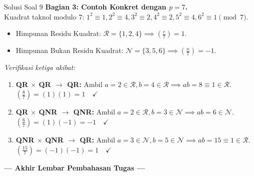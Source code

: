 \documentclass[11pt,a4paper]{article}
\begin{document}
\begin{solusibox}{Solusi Soal 9}
\textbf{Bagian 3: Contoh Konkret dengan $p = 7$.} \\
Kuadrat taknol modulo $7$: $1^2 \equiv 1, 2^2 \equiv 4, 3^2 \equiv 2, 4^2 \equiv 2, 5^2 \equiv 4, 6^2 \equiv 1 \pmod 7$.
\begin{itemize}
    \item Himpunan Residu Kuadrat: $\mathcal{R} = \{1, 2, 4\} \implies \left(\frac{r}{7}\right) = 1$.
    \item Himpunan Bukan Residu Kuadrat: $\mathcal{N} = \{3, 5, 6\} \implies \left(\frac{n}{7}\right) = -1$.
\end{itemize}
\textit{Verifikasi ketiga akibat:}
\begin{enumerate}
    \item \textbf{QR $\times$ QR $\rightarrow$ QR:} Ambil $a = 2 \in \mathcal{R}, b = 4 \in \mathcal{R} \implies ab = 8 \equiv 1 \in \mathcal{R}$.  
    $\left(\frac{8}{7}\right) = (1)(1) = 1 \quad \checkmark$
    \item \textbf{QR $\times$ QNR $\rightarrow$ QNR:} Ambil $a = 2 \in \mathcal{R}, b = 3 \in \mathcal{N} \implies ab = 6 \in \mathcal{N}$.  
    $\left(\frac{6}{7}\right) = (1)(-1) = -1 \quad \checkmark$
    \item \textbf{QNR $\times$ QNR $\rightarrow$ QR:} Ambil $a = 3 \in \mathcal{N}, b = 5 \in \mathcal{N} \implies ab = 15 \equiv 1 \in \mathcal{R}$.  
    $\left(\frac{15}{7}\right) = (-1)(-1) = 1 \quad \checkmark$
\end{enumerate}
\end{solusibox}

\vspace{0.4cm}
\begin{center}
\textbf{--- Akhir Lembar Pembahasan Tugas ---}
\end{center}
\end{document}
